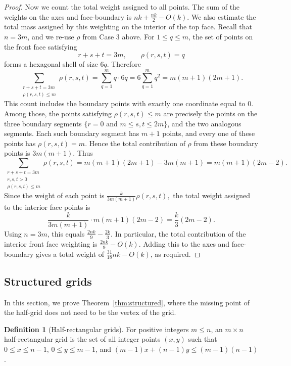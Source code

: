 \documentclass[usenames,dvipsnames, 11pt]{article}
\numberwithin{thm}{section}
\theoremstyle{definition}
\newtheorem{mydef}{Definition}
\theoremstyle{definition}
\theoremstyle{definition}
\newcommand{\1}{\mathbf{1}}
\begin{document}
\begin{proof}
Now we count the total weight assigned to all points. The sum of the weights on the axes and face-boundary is $nk+\frac{nk}{2}-O(k)$. We also estimate the total mass assigned by this weighting on the interior
of the top face. Recall that $n=3m$, and we re-use $\rho$ from Case 3 above.
For $1\leq q\leq m$, the set of points on the front face satisfying
\[
r+s+t=3m,\qquad \rho(r,s,t)=q
\]
forms a hexagonal shell of size $6q$. Therefore
\[
\sum_{\substack{r+s+t=3m\\ \rho(r,s,t)\leq m}} \rho(r,s,t)
=
\sum_{q=1}^{m} q\cdot 6q
=
6\sum_{q=1}^{m}q^2
=
m(m+1)(2m+1).
\]
This count includes the boundary points with exactly one coordinate equal to
$0$. Among those, the points satisfying $\rho(r,s,t)\leq m$ are precisely
the points on the three boundary segments $\{r=0 \text{ \ \ and \ \ } m\leq s,t\leq 2m\} $,
and the two analogous segments. Each such boundary segment has $m+1$ points,
and every one of these points has $\rho(r,s,t)=m$. Hence the total
contribution of $\rho$ from these boundary points is $3m(m+1)$.
Thus
\[
\sum_{\substack{r+s+t=3m\\ r,s,t>0\\ \rho(r,s,t)\leq m}}
\rho(r,s,t)
=
m(m+1)(2m+1)-3m(m+1)
=
m(m+1)(2m-2).
\]
Since the weight of each point is
$\frac{k}{3m(m+1)}\rho(r,s,t),$
the total weight assigned to the interior face points is
\[
\frac{k}{3m(m+1)}
\cdot
m(m+1)(2m-2)
=
\frac{k}{3}(2m-2).
\]
Using $n=3m$, this equals $\frac{2nk}{9}-\frac{2k}{3}$.
In particular, the total contribution of the interior front face weighting is $\frac{2nk}{9}-O(k)$. Adding this to the axes and face-boundary gives a total weight of $\frac{31}{18}nk-O(k)$, as required.
\end{proof}




\subsection{Structured grids}
\label{sec:structured}

In this section, we prove Theorem~\ref{thm:structured}, where the missing point of the half-grid does not need to be the vertex of the grid. 


\begin{mydef}[Half-rectangular grids]
For positive integers $m \leq n$, an $m \times n$ half-rectangular grid is the set of all integer points $(x,y)$ such that $0 \leq x \leq n-1$, $0 \leq y \leq m-1$, and $(m-1)x+(n-1)y \leq (m-1)(n-1)$.
\end{mydef}
\end{document}
